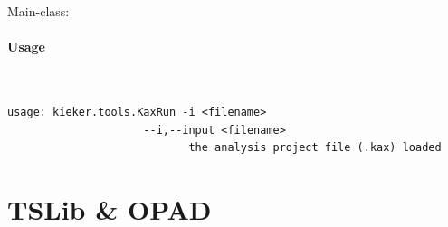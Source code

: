 			\noindent Main-class: {\small {}}

			\paragraph*{Usage}\

				\setTextListing
				\begin{lstlisting}[gobble = 10]
					usage: kieker.tools.KaxRun -i <filename>
					 --i,--input <filename>
							the analysis project file (.kax) loaded
				\end{lstlisting}	
			
	\section{TSLib \& OPAD}
	